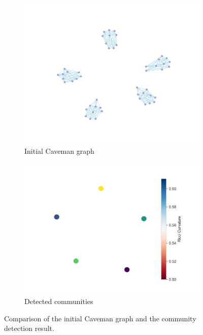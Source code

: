 \documentclass[12pt,a4paper]{article}
\begin{document}
\begin{figure}[ht!]
    \centering
    \begin{subfigure}[b]{0.45\textwidth}
        \centering
        \includegraphics[width=\textwidth]{ToyModelResults/Caveman_resluts/BeforeRicciFlow.png}
        \caption{Initial Caveman graph}
        \label{fig:caveman_initial}
    \end{subfigure}
    \hfill
    \begin{subfigure}[b]{0.45\textwidth}
        \centering
        \includegraphics[width=\textwidth]{ToyModelResults/Caveman_resluts/Communities.png}
        \caption{Detected communities}
        \label{fig:caveman_result}
    \end{subfigure}
    \caption{Comparison of the initial Caveman graph and the community detection result.}
    \label{fig4}
\end{figure}
\end{document}
